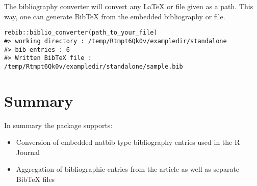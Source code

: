 The bibliography converter will convert any LaTeX or  file given as a path. This way, one can generate BibTeX from the embedded bibliography or  file.
\begin{verbatim}
rebib::biblio_converter(path_to_your_file)
#> working directory : /temp/Rtmpt6Qk0v/exampledir/standalone
#> bib entries : 6
#> Written BibTeX file : /temp/Rtmpt6Qk0v/exampledir/standalone/sample.bib
\end{verbatim}

\section{Summary}

In summary the  package supports:
\begin{itemize}
\item Conversion of embedded natbib type bibliography entries used in the R Journal
\item Aggregation of bibliographic entries from the article as well as separate BibTeX files
\end{itemize}


\address{%
Abhishek Ulayil\\
Student, Institute of Actuaries of India\\%
Mumbai, India\\
ORCiD: 0009-0000-6935-8690\\
}

